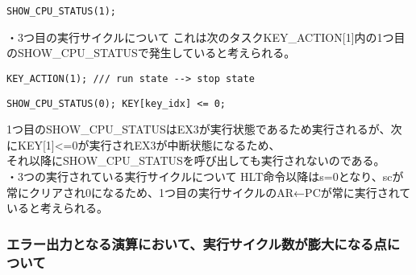 \documentclass{jsarticle}
\begin{document}
\begin{lstlisting}[caption=test\_fpga\_ex3.v 265行目]
SHOW_CPU_STATUS(1);
\end{lstlisting}

・3つ目の実行サイクルについて
これは次のタスクKEY\_ACTION[1]内の1つ目のSHOW\_CPU\_STATUSで発生していると考えられる。 \\

\begin{lstlisting}[caption=test\_fpga\_ex3.v 268行目]
KEY_ACTION(1); /// run state --> stop state
\end{lstlisting}

\begin{lstlisting}[caption=test\_fpga\_ex3.v 225行目]
SHOW_CPU_STATUS(0); KEY[key_idx] <= 0;
\end{lstlisting}

1つ目のSHOW\_CPU\_STATUSはEX3が実行状態であるため実行されるが、次にKEY[1]<=0が実行されEX3が中断状態になるため、 \\
それ以降にSHOW\_CPU\_STATUSを呼び出しても実行されないのである。 \\

・3つの実行されている実行サイクルについて
HLT命令以降はs=0となり、scが常にクリアされ0になるため、1つ目の実行サイクルのAR←PCが常に実行されていると考えられる。 \\

\subsubsection*{エラー出力となる演算において、実行サイクル数が膨大になる点について}
\end{document}
